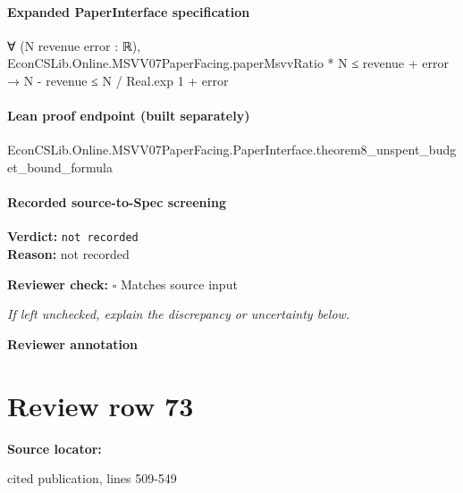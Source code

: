 \documentclass[10pt]{article}
\newcommand{\reviewerbox}{%
  \par\noindent\fbox{\parbox{0.96\linewidth}{\rule{0pt}{0.38in}}}\par
}
\newcommand{\reviewmatch}[1]{%
  \par\noindent\textbf{Reviewer check:} $\square$\; #1\par
  \noindent\emph{If left unchecked, explain the discrepancy or uncertainty below.}\par
}
\begin{document}
\paragraph{Expanded PaperInterface specification}
\begin{ReviewVerbatim}
∀ (N revenue error : ℝ),
  EconCSLib.Online.MSVV07PaperFacing.paperMsvvRatio * N ≤ revenue + error → N - revenue ≤ N / Real.exp 1 + error
\end{ReviewVerbatim}

\paragraph{Lean proof endpoint (built separately)}\begin{ReviewVerbatim}
EconCSLib.Online.MSVV07PaperFacing.PaperInterface.theorem8_unspent_budget_bound_formula
\end{ReviewVerbatim}

\paragraph{Recorded source-to-Spec screening}
\textbf{Verdict:} \texttt{not recorded}
\\
\textbf{Reason:} not recorded
\reviewmatch{Matches source input}
\noindent\textbf{Reviewer annotation}\par
\reviewerbox
\clearpage
\hypertarget{source-claim-9cbb92adc3a34ca2}{}
\section*{Review row 73}
\textbf{Source locator:} {\footnotesize\raggedright cited publication, lines 509-\allowbreak{}549\par}
\end{document}
